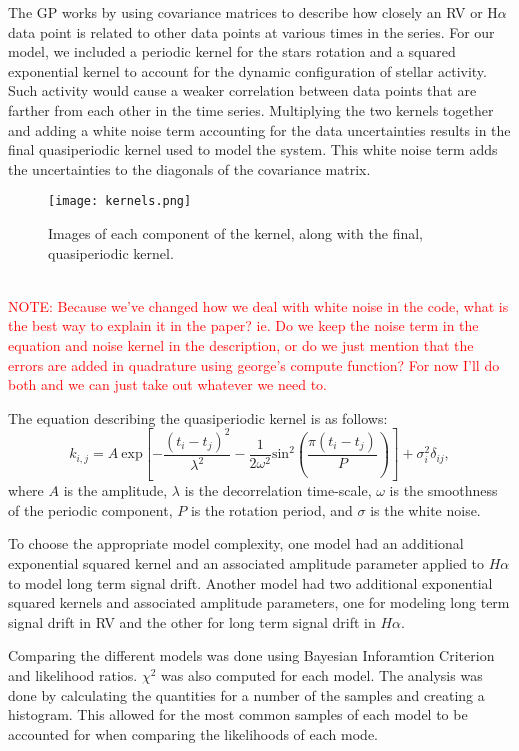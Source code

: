 \documentclass{aastex6}
\begin{document}
The GP works by using covariance matrices to describe how closely an RV or H$\alpha$ data point is related to other data points at various times in the series. For our model, we included a periodic kernel for the stars rotation and a squared exponential kernel to account for the dynamic configuration of stellar activity. Such activity would cause a weaker correlation between data points that are farther from each other in the time series. Multiplying the two kernels together and adding a white noise term accounting for the data uncertainties results in the final quasiperiodic kernel used to model the system. This white noise term adds the uncertainties to the diagonals of the covariance matrix.
\begin{figure} \label{fig:kernel_visual}
    \begin{center}
    \texttt{[image: kernels.png]}
    \caption{Images of each component of the kernel, along with the final, quasiperiodic kernel.}
     \end{center}
\end{figure}\\
\textcolor{red}{NOTE: Because we've changed how we deal with white noise in the code, what is the best way to explain it in the paper? ie. Do we keep the noise term in the equation and noise kernel in the description, or do we just mention that the errors are added in quadrature using george's compute function? For now I'll do both and we can just take out whatever we need to.}


The equation describing the quasiperiodic kernel is as follows:
\begin{equation} \label{eq:quasi_kernel}
  k_{i,j} = A\ \mathrm{exp}\left[-\frac{(t_i - t_j)^2}{\lambda^2} - \frac{1}{2\omega^2}\mathrm{sin}^2\left(\frac{\pi(t_i -t_j)}{P}\right)\right] + \sigma_i^2\delta_{ij},%
  \end{equation}
where $A$ is the amplitude, $\lambda$ is the decorrelation time-scale, $\omega$ is the smoothness of the periodic component, $P$ is the rotation period, and $\sigma$ is the white noise.\par
To choose the appropriate model complexity, one model had an additional exponential squared kernel and an associated amplitude parameter applied to $H\alpha$ to model long term signal drift. Another model had two additional exponential squared kernels and associated amplitude parameters, one for modeling long term signal drift in RV and the other for long term signal drift in $H\alpha$. \par
Comparing the different models was done using Bayesian Inforamtion Criterion and likelihood ratios. $\chi^2$ was also computed for each model. The analysis was done by calculating the quantities for a number of the samples and creating a histogram. This allowed for the most common samples of each model to be accounted for when comparing the likelihoods of each mode.
\end{document}
